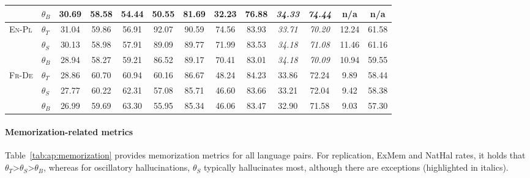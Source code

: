 \begin{minipage}{\textwidth}
\begin{center}
{\begin{tabular}{llccccccccccc}
                                              & $\theta_{B}$ & 30.69 & 58.58 & 54.44 & 50.55          & 81.69 & 32.23 & 76.88          & \textit{34.33} & \textit{74.44} & n/a   & n/a \\ \midrule
    \multirow{3}{*}{\textsc{En}-\textsc{Pl}}  & $\theta_T$   & 31.04 & 59.86 & 56.91 & 92.07          & 90.59 & 74.56 & 83.93          & \textit{33.71} & \textit{70.20} & 12.24 & 61.58 \\
                                              & $\theta_{S}$ & 30.13 & 58.98 & 57.91 & 89.09          & 89.77 & 71.99 & 83.53          & \textit{34.18} & \textit{71.08} & 11.46 & 61.16 \\
                                              & $\theta_{B}$ & 28.94 & 58.27 & 59.21 & 86.52          & 89.17 & 70.41 & 83.01          & \textit{34.18} & \textit{70.09} & 10.94 & 59.55 \\ \midrule
    \multirow{3}{*}{\textsc{Fr}-\textsc{De}}  & $\theta_T$   & 28.86 & 60.70 & 60.94 & 60.16          & 86.67 & 48.24 & 84.23          & 33.86          & 72.24          & 9.89  & 58.44 \\
                                              & $\theta_{S}$ & 27.77 & 60.22 & 62.31 & 57.08          & 85.71 & 46.60 & 83.66          & 33.21          & 72.04          & 9.42  & 58.38 \\
                                              & $\theta_{B}$ & 26.99 & 59.69 & 63.30 & 55.95          & 85.34 & 46.06 & 83.47          & 32.90          & 71.58          & 9.03  & 57.30 \\
    \bottomrule
    \end{tabular}}
    \end{center}
    \label{tab:ap:model_quality}
\end{minipage}

\clearpage
\paragraph{Memorization-related metrics} Table~\ref{tab:ap:memorization} provides memorization metrics for all language pairs.
For replication, ExMem and NatHal rates, it holds that $\theta_T$>$\theta_S$>$\theta_B$, whereas for oscillatory hallucinations, $\theta_S$ typically hallucinates most, although there are exceptions (highlighted in italics).

